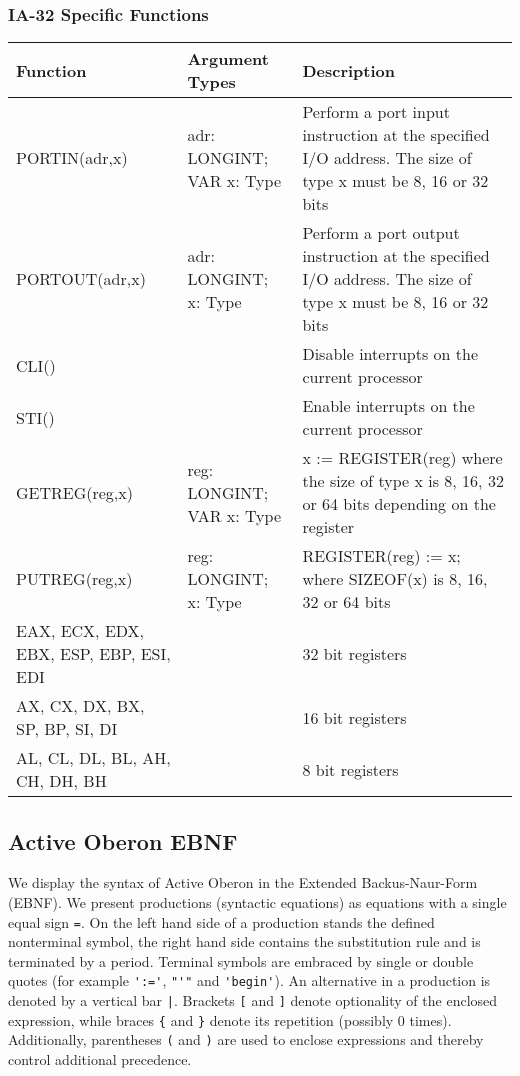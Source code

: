 \documentclass[a4paper,11pt]{article}
\begin{document}
\subsubsection{IA-32 Specific Functions}
\begin{longtable}{|p{3cm}|p{3cm}|p{8cm}|}
\hline
Function & Argument Types & Description \\
\hline\hline
\endhead
PORTIN(adr,x) & adr: LONGINT; VAR x: Type & Perform a port input instruction at the specified I/O address. The size of type x must be 8, 16 or 32 bits \\
PORTOUT(adr,x) & adr: LONGINT; x: Type & Perform a port output instruction at the specified I/O address. The size of type x must be 8, 16 or 32 bits \\
\hline
CLI() && Disable interrupts on the current processor \\
STI() && Enable interrupts on the current processor \\
\hline
GETREG(reg,x) & reg: LONGINT; VAR x: Type & x := REGISTER(reg) where the size of type x is 8, 16, 32 or 64 bits depending on the register \\
PUTREG(reg,x) & reg: LONGINT; x: Type & REGISTER(reg) := x; where SIZEOF(x) is 8, 16, 32 or 64 bits \\
\hline
EAX, ECX, EDX, EBX, ESP, EBP, ESI, EDI && 32 bit registers \\
AX, CX, DX, BX, SP, BP, SI, DI && 16 bit registers \\
AL, CL, DL, BL, AH, CH, DH, BH && 8 bit registers \\
\hline
\end{longtable}


\subsection{Active Oberon EBNF}
We display the syntax of Active Oberon in the Extended Backus-Naur-Form (EBNF). We present productions (syntactic equations) as equations with a single equal sign \verb~=~. On the left hand side of a production stands the defined nonterminal symbol, the right hand side contains the substitution rule and is terminated by a period. Terminal symbols are embraced by single or double quotes (for example \verb~':='~, \verb~"'"~ and \verb~'begin'~). An alternative in a production is denoted by a vertical bar \verb~|~. Brackets \verb~[~ and \verb~]~ denote optionality of the enclosed expression, while braces \verb~{~ and \verb~}~ denote its repetition (possibly 0 times). Additionally, parentheses \verb~(~ and \verb~)~ are used to enclose expressions and thereby control additional precedence.
\end{document}
